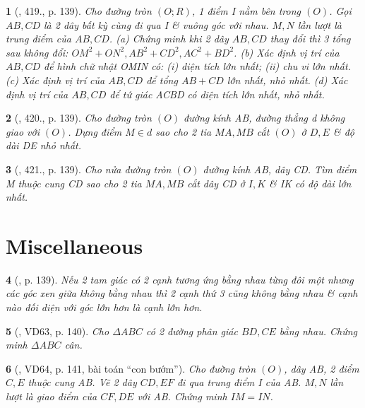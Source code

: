 \documentclass{article}
\newtheorem{baitoan}{}
\begin{document}
\begin{baitoan}[\cite{Binh_Toan_9_tap_2}, 419., p. 139]
	Cho đường tròn $(O;R)$, 1 điểm I nằm bên trong $(O)$. Gọi $AB,CD$ là 2 dây bất kỳ cùng đi qua I \& vuông góc với nhau. $M,N$ lần lượt là trung điểm của $AB,CD$. (a) Chứng minh khi 2 dây $AB,CD$ thay đổi thì 3 tổng sau không đổi: $OM^2 + ON^2,AB^2 + CD^2,AC^2 + BD^2$. (b) Xác định vị trí của $AB,CD$ để hình chữ nhật OMIN có: (i) diện tích lớn nhất; (ii) chu vi lớn nhất. (c) Xác định vị trí của $AB,CD$ để tổng $AB + CD$ lớn nhất, nhỏ nhất. (d) Xác định vị trí của $AB,CD$ để tứ giác ACBD có diện tích lớn nhất, nhỏ nhất.
\end{baitoan}

\begin{baitoan}[\cite{Binh_Toan_9_tap_2}, 420., p. 139]
	Cho đường tròn $(O)$ đường kính AB, đường thẳng d không giao với $(O)$. Dựng điểm $M\in d$ sao cho 2 tia $MA,MB$ cắt $(O)$ ở $D,E$ \& độ dài DE nhỏ nhất.
\end{baitoan}

\begin{baitoan}[\cite{Binh_Toan_9_tap_2}, 421., p. 139]
	Cho nửa đường tròn $(O)$ đường kính AB, dây CD. Tìm điểm M thuộc cung CD sao cho 2 tia $MA,MB$ cắt dây CD ở $I,K$ \& IK có độ dài lớn nhất.
\end{baitoan}


\section{Miscellaneous}

\begin{baitoan}[\cite{Binh_Toan_9_tap_2}, p. 139]
	Nếu 2 tam giác có 2 cạnh tương ứng bằng nhau từng đôi một nhưng các góc xen giữa không bằng nhau thì 2 cạnh thứ 3 cũng không bằng nhau \& cạnh nào đối diện với góc lớn hơn là cạnh lớn hơn.
\end{baitoan}

\begin{baitoan}[\cite{Binh_Toan_9_tap_2}, VD63, p. 140]
	Cho $\Delta ABC$ có 2 đường phân giác $BD,CE$ bằng nhau. Chứng minh $\Delta ABC$ cân.
\end{baitoan}

\begin{baitoan}[\cite{Binh_Toan_9_tap_2}, VD64, p. 141, bài toán ``con bướm'']
	Cho đường tròn $(O)$, dây AB, 2 điểm $C,E$ thuộc cung AB. Vẽ 2 dây $CD,EF$ đi qua trung điểm I của AB. $M,N$ lần lượt là giao điểm của $CF,DE$ với AB. Chứng minh $IM = IN$.
\end{baitoan}
\end{document}
